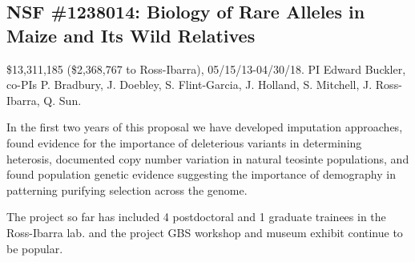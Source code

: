 \subsection*{NSF \#1238014: Biology of Rare Alleles in Maize and Its Wild Relatives}
\$13,311,185 (\$2,368,767 to Ross-Ibarra), 05/15/13-04/30/18. PI Edward Buckler, co-PIs P. Bradbury, J. Doebley,  S. Flint-Garcia, J. Holland,  S. Mitchell, J. Ross-Ibarra, Q. Sun.
\par{} In the first two years of this proposal we have developed imputation approaches, found evidence for the importance of deleterious variants in determining heterosis, documented copy number variation in natural teosinte populations, and found population genetic evidence suggesting the importance of demography in patterning purifying selection across the genome. 
\par{} The project so far has included 4 postdoctoral and 1 graduate trainees in the Ross-Ibarra lab. and the project GBS workshop and museum exhibit continue to be popular. 
\par{} \citet{tiffin2014advances, Takuno15062015, da2015origin, hake2015genetic, makarevitch2015transposable} 
